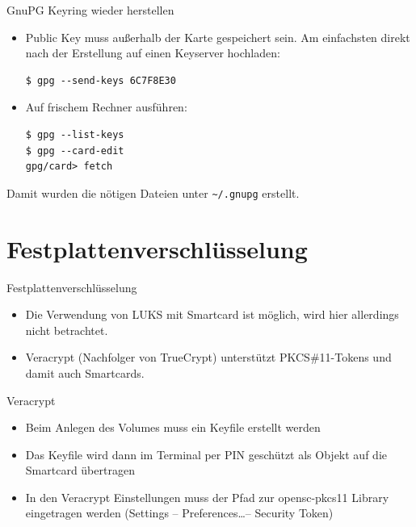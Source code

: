 \documentclass{beamer}
\begin{document}
\begin{frame}[fragile]{GnuPG Keyring wieder herstellen}
\begin{minipage}[t][\textheight][t]{\linewidth}
\begin{itemize}
  \item Public Key muss außerhalb der Karte gespeichert sein. Am einfachsten
  direkt nach der Erstellung auf einen Keyserver hochladen:
  \begin{lstlisting}
$ gpg --send-keys 6C7F8E30
  \end{lstlisting}
  \item Auf frischem Rechner ausführen:
  \begin{lstlisting}
$ gpg --list-keys
$ gpg --card-edit
gpg/card> fetch
  \end{lstlisting}
\end{itemize}
Damit wurden die nötigen Dateien unter \lstinline{~/.gnupg} erstellt.
\end{minipage}
\end{frame}

\section{Festplattenverschlüsselung}

\begin{frame}[fragile]{Festplattenverschlüsselung}
\begin{minipage}[t][\textheight][t]{\linewidth}
\begin{itemize}
  \item Die Verwendung von LUKS mit Smartcard ist möglich, wird hier allerdings
  nicht betrachtet.
  \item Veracrypt (Nachfolger von TrueCrypt) unterstützt PKCS\#11-Tokens und
  damit auch Smartcards.
\end{itemize}
\end{minipage}
\end{frame}

\begin{frame}[fragile]{Veracrypt}
\begin{minipage}[t][\textheight][t]{\linewidth}
\begin{itemize}
  \item Beim Anlegen des Volumes muss ein Keyfile erstellt werden
  \item Das Keyfile wird dann im Terminal per PIN geschützt als Objekt auf die
  Smartcard übertragen
  \item In den Veracrypt Einstellungen muss der Pfad zur opensc-pkcs11 Library
  eingetragen werden (Settings -- Preferences\ldots -- Security Token)
\end{itemize}
\end{minipage}
\end{frame}
\end{document}
